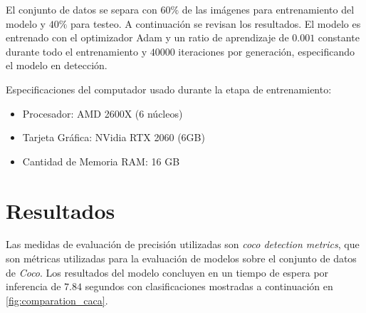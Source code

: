 \documentclass[letter,12pt]{report}
\begin{document}
El conjunto de datos se separa con $60\%$ de las imágenes para entrenamiento del modelo y
$40\%$ para testeo. A continuación se revisan los resultados. El modelo es entrenado con el
optimizador Adam y un ratio de aprendizaje de $0.001$ constante durante todo el entrenamiento
y $40000$ iteraciones por generación, especificando el modelo en detección.

Especificaciones del computador usado durante la etapa de entrenamiento:

\begin{itemize}
    \item Procesador: AMD 2600X (6 núcleos)
    \item Tarjeta Gráfica: NVidia RTX 2060 (6GB)
    \item Cantidad de Memoria RAM: 16 GB
\end{itemize}

\section{Resultados}
Las medidas de evaluación de precisión utilizadas son \textit{coco detection metrics},
que son métricas utilizadas para la evaluación de modelos sobre el conjunto de datos de
\textit{Coco}. Los resultados del modelo concluyen en un tiempo de espera por inferencia
de $7.84$ segundos con clasificaciones mostradas a continuación en \ref{fig:comparation_caca}.
\end{document}
